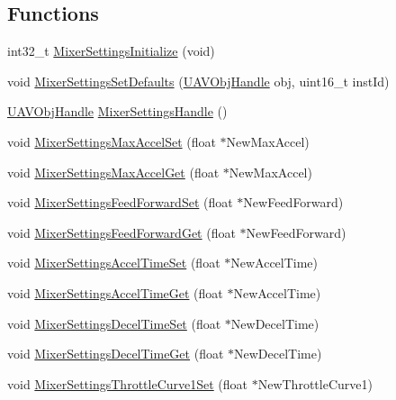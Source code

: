 \subsection*{\-Functions}
\begin{DoxyCompactItemize}
\item 
int32\-\_\-t \hyperlink{group___mixer_settings_ga9802e38d239e7d6a725d871d87699a97}{\-Mixer\-Settings\-Initialize} (void)
\item 
void \hyperlink{group___mixer_settings_ga047b8a8ae92ca43bd45329948f3f5db8}{\-Mixer\-Settings\-Set\-Defaults} (\hyperlink{targets_2_u_a_v_objects_2inc_2uavobjectmanager_8h_a279053e22be53ce9f895043aaeb91e3b}{\-U\-A\-V\-Obj\-Handle} obj, uint16\-\_\-t inst\-Id)
\item 
\hyperlink{targets_2_u_a_v_objects_2inc_2uavobjectmanager_8h_a279053e22be53ce9f895043aaeb91e3b}{\-U\-A\-V\-Obj\-Handle} \hyperlink{group___mixer_settings_ga6c9d4ae809f4c1413bd112254e2190b1}{\-Mixer\-Settings\-Handle} ()
\item 
void \hyperlink{group___mixer_settings_ga05bc02e4c05c8ea73038ef3a76b2792a}{\-Mixer\-Settings\-Max\-Accel\-Set} (float $\ast$\-New\-Max\-Accel)
\item 
void \hyperlink{group___mixer_settings_gae119d44986b312e6fe91b98b23f69f53}{\-Mixer\-Settings\-Max\-Accel\-Get} (float $\ast$\-New\-Max\-Accel)
\item 
void \hyperlink{group___mixer_settings_ga103d2e164c64fc5d3d9eefc1f12877ca}{\-Mixer\-Settings\-Feed\-Forward\-Set} (float $\ast$\-New\-Feed\-Forward)
\item 
void \hyperlink{group___mixer_settings_ga8a8296f0eb9c355eb444a8dc75cf9177}{\-Mixer\-Settings\-Feed\-Forward\-Get} (float $\ast$\-New\-Feed\-Forward)
\item 
void \hyperlink{group___mixer_settings_gaff05c2979c229263be3bd5c11d8b7439}{\-Mixer\-Settings\-Accel\-Time\-Set} (float $\ast$\-New\-Accel\-Time)
\item 
void \hyperlink{group___mixer_settings_gae94e07845225f5e1035f5e6e7b9d2ea7}{\-Mixer\-Settings\-Accel\-Time\-Get} (float $\ast$\-New\-Accel\-Time)
\item 
void \hyperlink{group___mixer_settings_gaee82f91852bf94c52bab33460b384e65}{\-Mixer\-Settings\-Decel\-Time\-Set} (float $\ast$\-New\-Decel\-Time)
\item 
void \hyperlink{group___mixer_settings_gaff3d2fc1fd0e93bea835130dae5356ef}{\-Mixer\-Settings\-Decel\-Time\-Get} (float $\ast$\-New\-Decel\-Time)
\item 
void \hyperlink{group___mixer_settings_ga6700feee1e1056cb606540f5cdec01d5}{\-Mixer\-Settings\-Throttle\-Curve1\-Set} (float $\ast$\-New\-Throttle\-Curve1)

\end{DoxyCompactItemize}
